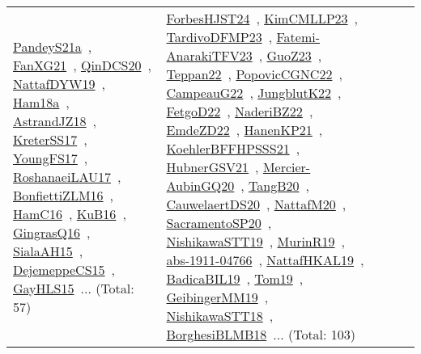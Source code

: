 {\begin{longtable}{lp{3cm}>{\raggedright\arraybackslash}p{6cm}>{\raggedright\arraybackslash}p{6cm}>{\raggedright\arraybackslash}p{8cm}}
\href{works/PandeyS21a.pdf}{PandeyS21a}~\cite{PandeyS21a}, \href{works/FanXG21.pdf}{FanXG21}~\cite{FanXG21}, \href{works/QinDCS20.pdf}{QinDCS20}~\cite{QinDCS20}, \href{works/NattafDYW19.pdf}{NattafDYW19}~\cite{NattafDYW19}, \href{works/Ham18a.pdf}{Ham18a}~\cite{Ham18a}, \href{works/AstrandJZ18.pdf}{AstrandJZ18}~\cite{AstrandJZ18}, \href{works/KreterSS17.pdf}{KreterSS17}~\cite{KreterSS17}, \href{works/YoungFS17.pdf}{YoungFS17}~\cite{YoungFS17}, \href{works/RoshanaeiLAU17.pdf}{RoshanaeiLAU17}~\cite{RoshanaeiLAU17}, \href{works/BonfiettiZLM16.pdf}{BonfiettiZLM16}~\cite{BonfiettiZLM16}, \href{works/HamC16.pdf}{HamC16}~\cite{HamC16}, \href{works/KuB16.pdf}{KuB16}~\cite{KuB16}, \href{works/GingrasQ16.pdf}{GingrasQ16}~\cite{GingrasQ16}, \href{works/SialaAH15.pdf}{SialaAH15}~\cite{SialaAH15}, \href{works/DejemeppeCS15.pdf}{DejemeppeCS15}~\cite{DejemeppeCS15}, \href{works/GayHLS15.pdf}{GayHLS15}~\cite{GayHLS15}... (Total: 57) & \href{works/ForbesHJST24.pdf}{ForbesHJST24}~\cite{ForbesHJST24}, \href{works/KimCMLLP23.pdf}{KimCMLLP23}~\cite{KimCMLLP23}, \href{works/TardivoDFMP23.pdf}{TardivoDFMP23}~\cite{TardivoDFMP23}, \href{works/Fatemi-AnarakiTFV23.pdf}{Fatemi-AnarakiTFV23}~\cite{Fatemi-AnarakiTFV23}, \href{works/GuoZ23.pdf}{GuoZ23}~\cite{GuoZ23}, \href{works/Teppan22.pdf}{Teppan22}~\cite{Teppan22}, \href{works/PopovicCGNC22.pdf}{PopovicCGNC22}~\cite{PopovicCGNC22}, \href{works/CampeauG22.pdf}{CampeauG22}~\cite{CampeauG22}, \href{works/JungblutK22.pdf}{JungblutK22}~\cite{JungblutK22}, \href{works/FetgoD22.pdf}{FetgoD22}~\cite{FetgoD22}, \href{works/NaderiBZ22.pdf}{NaderiBZ22}~\cite{NaderiBZ22}, \href{works/EmdeZD22.pdf}{EmdeZD22}~\cite{EmdeZD22}, \href{works/HanenKP21.pdf}{HanenKP21}~\cite{HanenKP21}, \href{works/KoehlerBFFHPSSS21.pdf}{KoehlerBFFHPSSS21}~\cite{KoehlerBFFHPSSS21}, \href{works/HubnerGSV21.pdf}{HubnerGSV21}~\cite{HubnerGSV21}, \href{works/Mercier-AubinGQ20.pdf}{Mercier-AubinGQ20}~\cite{Mercier-AubinGQ20}, \href{works/TangB20.pdf}{TangB20}~\cite{TangB20}, \href{works/CauwelaertDS20.pdf}{CauwelaertDS20}~\cite{CauwelaertDS20}, \href{works/NattafM20.pdf}{NattafM20}~\cite{NattafM20}, \href{works/SacramentoSP20.pdf}{SacramentoSP20}~\cite{SacramentoSP20}, \href{works/NishikawaSTT19.pdf}{NishikawaSTT19}~\cite{NishikawaSTT19}, \href{works/MurinR19.pdf}{MurinR19}~\cite{MurinR19}, \href{works/abs-1911-04766.pdf}{abs-1911-04766}~\cite{abs-1911-04766}, \href{works/NattafHKAL19.pdf}{NattafHKAL19}~\cite{NattafHKAL19}, \href{works/BadicaBIL19.pdf}{BadicaBIL19}~\cite{BadicaBIL19}, \href{works/Tom19.pdf}{Tom19}~\cite{Tom19}, \href{works/GeibingerMM19.pdf}{GeibingerMM19}~\cite{GeibingerMM19}, \href{works/NishikawaSTT18.pdf}{NishikawaSTT18}~\cite{NishikawaSTT18}, \href{works/BorghesiBLMB18.pdf}{BorghesiBLMB18}~\cite{BorghesiBLMB18}... (Total: 103)\\

\end{longtable}}
